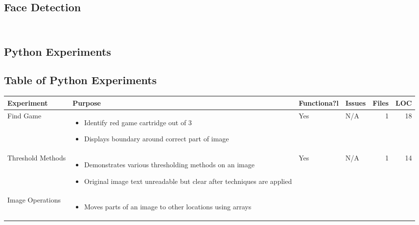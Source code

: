 	\subsection{Face Detection}
	\inputminted[breaklines,
					linenos,
					frame=lines,
					fontsize=\footnotesize]{java}{../code/android/face_recognition/DetectionBasedTracker.java}
	\inputminted[breaklines,
					linenos,
					frame=lines,
					fontsize=\footnotesize]{java}{../code/android/face_recognition/FrActivity.java}
	\clearpage
		\thispagestyle{empty}
		\begin{landscape}
			\section{Python Experiments}\label{app:python_experiments}
			\subsection{Table of Python Experiments}
			\begin{table}[h!]
				\centering
				\label{tab:python_experiments}
				\begin{tabular}{|l|p{0.4\textwidth}|l|p{}|r|r|}
					\hline
					\bfseries Experiment&\bfseries Purpose&\bfseries Functiona?l&\bfseries Issues&\bfseries Files&\bfseries LOC\\
					\hline
					Find Game&
					\begin{itemize}[noitemsep,topsep=0pt,parsep=0pt]
						\item{Identify red game cartridge out of 3}
						\item{Displays boundary around correct part of image}
					\end{itemize}&
					Yes&
					N/A&
					1&
					18\\
					\hline
					Threshold Methods&
					\begin{itemize}[noitemsep,topsep=0pt,parsep=0pt]
						\item{Demonstrates various thresholding methods on an image}
						\item{Original image text unreadable but clear after techniques are applied}
					\end{itemize}&
					Yes&
					N/A&
					1&
					14\\
					\hline
					Image Operations&
					\begin{itemize}[noitemsep,topsep=0pt,parsep=0pt]
						\item{Moves parts of an image to other locations using arrays}

\end{itemize}
\end{tabular}
\end{table}
\end{landscape}

